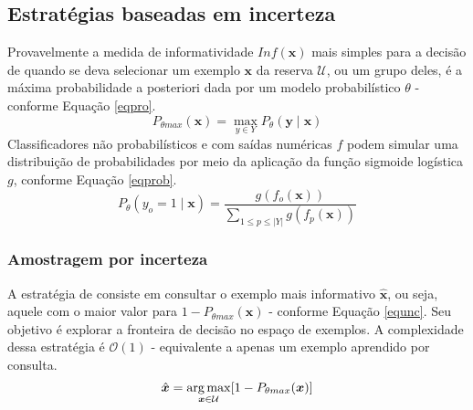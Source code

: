 \subsection{Estratégias baseadas em incerteza}\label{estsunc}
Provavelmente a medida de informatividade $Inf(\bm{x})$ mais simples para a decisão de quando se deva selecionar um exemplo $\bm{x}$ da reserva $\mathcal{U}$, ou um grupo deles, é a máxima probabilidade a posteriori dada por um modelo probabilístico $\theta$  \cite{journals/sigir/Lewis95a} - conforme Equação \ref{eqpro}.
\begin{equation}\label{eqpro}
P_{\theta max}(\bm{x})=\max_{y\in Y}P_{\theta}(\bm{y}\mid\bm{x})
\end{equation}
Classificadores não probabilísticos e com saídas numéricas $f$ podem simular
uma distribuição de probabilidades por meio da aplicação da função 
sigmoide logística $g$, conforme Equação \ref{eqprob}.
\begin{equation} \label{eqprob}
 P_{\theta}(y_o=1\mid\bm{x}) = \frac{g(f_o(\bm{x}))}{\sum\limits_{1 \leq p \leq |Y|}g(f_p(\bm{x})) }
\end{equation}

\subsubsection{Amostragem por incerteza}\label{unc}
A estratégia de \textit{} consiste em consultar o exemplo mais informativo $\hat{\bm{x}}$,
ou seja, aquele com o maior valor para $1 - P_{\theta max}(\bm{x})$ - conforme Equação \ref{equnc}.
Seu objetivo é explorar a fronteira de decisão no espaço de exemplos.
A complexidade dessa estratégia é $\mathcal{O}(1)$ - equivalente
a apenas um exemplo aprendido por consulta.
\begin{equation} \label{equnc}
 \hat{\bm{x}}= \operatorname*{arg\,max}_{\bm{x}\in\mathcal{U}}[1 - P_{\theta max}(\bm{x})]
\end{equation}

